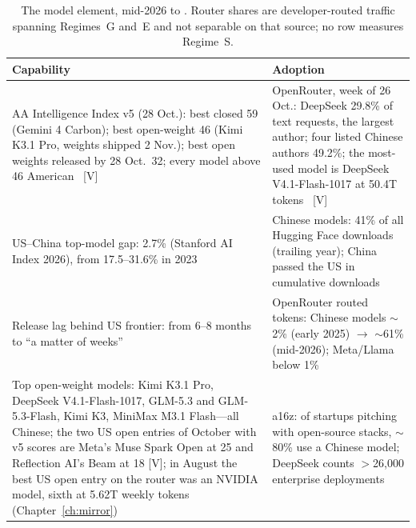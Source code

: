 \begin{table}[htbp]
  \centering
  \caption{The model element, mid-2026 to \datafreeze. Router shares are developer-routed traffic spanning Regimes~G and~E and not separable on that source; no row measures Regime~S.}
  \label{tab:model-scoreboard}
  \begin{tabular}{p{72mm}p{72mm}}
    \toprule
    Capability & Adoption \\
    \midrule
    AA Intelligence Index v5 (28 Oct.): best closed 59 (Gemini 4 Carbon); best open-weight 46 (Kimi K3.1 Pro, weights shipped 2 Nov.); best open weights released by 28 Oct.\ 32; every model above 46 American~\cite{mdl-aa-v5} [V] &
    OpenRouter, week of 26 Oct.: DeepSeek 29.8\% of text requests, the largest author; four listed Chinese authors 49.2\%; the most-used model is DeepSeek V4.1-Flash-1017 at 50.4T tokens~\cite{mdl-openrouter-oct26} [V] \\
    \addlinespace
    US--China top-model gap: 2.7\% (Stanford AI Index 2026), from 17.5--31.6\% in 2023~\cite{stanford-aiindex-2026} &
    Chinese models: 41\% of all Hugging Face downloads (trailing year); China passed the US in cumulative downloads~\cite{hf-spring-2026} \\
    \addlinespace
    Release lag behind US frontier: from 6--8 months to ``a matter of weeks''~\cite{aei-2026} &
    OpenRouter routed tokens: Chinese models $\sim$2\% (early 2025) $\rightarrow$ $\sim$61\% (mid-2026); Meta/Llama below 1\%~\cite{openrouter-2026,datagravity} \\
    \addlinespace
    Top open-weight models: Kimi K3.1 Pro, DeepSeek V4.1-Flash-1017, GLM-5.3 and GLM-5.3-Flash, Kimi K3, MiniMax M3.1 Flash---all Chinese; the two US open entries of October with v5 scores are Meta's Muse Spark Open at 25 and Reflection AI's Beam at 18 [V]; in August the best US open entry on the router was an NVIDIA model, sixth at 5.62T weekly tokens (Chapter~\ref{ch:mirror})~\cite{mdl-reflection-beam,openrouter-2026,openrouter-aug26} &
    a16z: of startups pitching with open-source stacks, $\sim$80\% use a Chinese model; DeepSeek counts $>$26,000 enterprise deployments~\cite{casado,sos-ai} \\
    \bottomrule
  \end{tabular}
\end{table}



